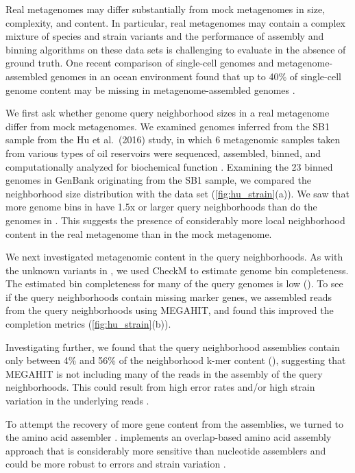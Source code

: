 Real metagenomes may differ substantially from mock metagenomes in
size, complexity, and content.  In particular, real metagenomes may
contain a complex mixture of species and strain variants \cite{Sharon2015}
and the performance of assembly and binning algorithms on these data sets
is challenging to evaluate in the absence of ground truth.
One recent comparison of single-cell genomes and metagenome-assembled
genomes in an ocean environment found that up to 40\% of single-cell
genome content may be missing in metagenome-assembled genomes \cite{baltic}.

We first ask whether genome query neighborhood sizes in a real
metagenome differ from mock metagenomes.  We examined genomes inferred
from the SB1 sample from the Hu et al.\ (2016) study, in which 6
metagenomic samples taken from various types of oil reservoirs were
sequenced, assembled, binned, and computationally analyzed for
biochemical function \cite{Hu2016}.  Examining the 23 binned genomes
in GenBank originating from the SB1 sample, we compared the \hu
neighborhood size distribution with the \podarv data set
(\autoref{fig:hu_strain}(a)). We saw that more genome bins in \hu
have 1.5x or larger query neighborhoods than do the genomes in
\podarv. This suggests the presence of considerably more local
neighborhood content in the real metagenome than in the mock
metagenome.

We next investigated metagenomic content in the query
neighborhoods.  As with the unknown variants in \podarv, we used
CheckM to estimate genome bin completeness.  The estimated bin
completeness for many of the query genomes is low
().
To see if the query neighborhoods contain missing marker genes, we
assembled reads from the query neighborhoods using MEGAHIT, and found
this improved the completion metrics (\autoref{fig:hu_strain}(b)).

Investigating further, we found that the query neighborhood assemblies
contain only between 4\% and 56\% of the neighborhood k-mer
content (), suggesting that MEGAHIT is
not including many of the reads in the assembly of the query neighborhoods.
This could result from high
error rates and/or high strain variation in the underlying reads
\cite{CAMI,Awad155358}.

To attempt the recovery of more gene content from the assemblies, we turned to
the \plass amino acid assembler \cite{plass}. \plass implements an
overlap-based amino acid assembly approach that is considerably more
sensitive than nucleotide assemblers and could be more robust to
errors and strain variation \cite{spa}.

